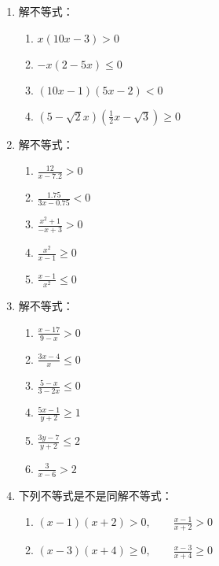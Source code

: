 \begin{ex}
\begin{enumerate}
    \item 解不等式：
    \begin{multicols}{2}
        \begin{enumerate}
    \item $x(10x-3)>0$
    \item $-x(2-5x)\le 0$
    \item $(10x-1)(5x-2)<0$
    \item $(5-\sqrt{2}x)\left(\frac{1}{2}x-\sqrt{3}\right)\ge 0$
\end{enumerate}
    \end{multicols}

    \item 解不等式：
    \begin{multicols}{2}
        \begin{enumerate}
    \item $\frac{12}{x-7.2}>0$
    \item $\frac{1.75}{3x-0.75}<0$
    \item $\frac{x^2+1}{-x+3}> 0$
    \item $\frac{x^2}{x-1}\ge 0 $
    \item $\frac{x-1}{x^2}\le 0 $
\end{enumerate}
    \end{multicols}
    \item 解不等式：
    \begin{multicols}{2}
        \begin{enumerate}
    \item $\frac{x-17}{9-x}>0 $
    \item $\frac{3x-4}{x}\le 0 $
    \item $\frac{5-x}{3-2x}\le 0$
    \item $\frac{5x-1}{y+2}\ge 1$
    \item $\frac{3y-7}{y+2}\le 2$
    \item $\frac{3}{x-6}>2$
\end{enumerate}
    \end{multicols}

    \item 下列不等式是不是同解不等式：
\begin{enumerate}
    \item $(x-1)(x+2)>0,\qquad \frac{x-1}{x+2}>0$
    \item $(x-3)(x+4)\ge 0,\qquad \frac{x-3}{x+4}\ge 0$
\end{enumerate}
\end{enumerate}
\end{ex}

